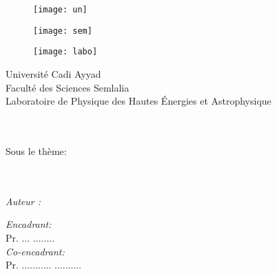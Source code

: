 
  \begin{titlepage}

    \begin{figure}[h!]
    \begin{minipage}[b]{0.25\linewidth}
    \begin{center}
    \texttt{[image: un]}
    \end{center}
    
   \end{minipage}\hfill
   \begin{minipage}[b]{0.45\linewidth}   
      \begin{center}
      \texttt{[image: sem]}
      \end{center}
      
   \end{minipage}
   \begin{minipage}[b]{0.27\linewidth}
      \begin{center}
       \texttt{[image: labo]}
      \end{center}
     
   \end{minipage}\hfill
   
\end{figure}
    \begin{center}
    \huge{ Université Cadi Ayyad} \\
    \large  Faculté des Sciences Semlalia\\
    Laboratoire de Physique des Hautes Énergies et Astrophysique
    \end{center}
     \HRule 
 \begin{center}
      
{\large \reportsubject}\\[0.5cm]
\HRule \\[0.4cm]
\Large Sous le thème: \\ \vspace{0.5cm}
{\Huge \bfseries \reporttitle}\\[0.4cm]
\HRule \\[0.8cm]


\begin{Large}
 
   \begin{minipage}[t]{0.45\linewidth}
      \begin{flushleft}
      \emph{Auteur :}\\
    \reportauthor
\end{flushleft}       
   \end{minipage}
    \begin{minipage}[t]{0.45\linewidth}   
      \begin{flushright}
          \emph{Encadrant:} \\
    Pr. ... \textsc{........} \\
    \emph{Co-encadrant:} \\
	Pr. ........... \textsc{..........}
\end{flushright}   
   \end{minipage}\hfill
 

\end{Large}
\end{center}
\end{titlepage}
